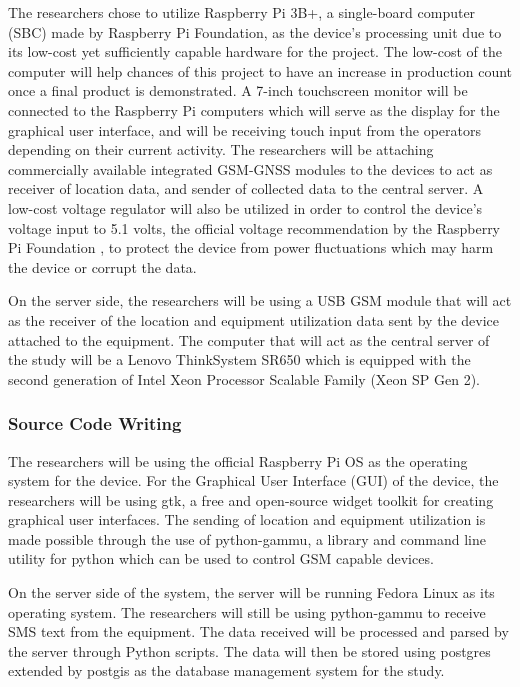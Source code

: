 \documentclass[12pt]{report}
\begin{document}
The researchers chose to utilize Raspberry Pi 3B+, a single-board computer (SBC) made by Raspberry Pi Foundation, as the device's processing unit due to its low-cost yet sufficiently capable hardware for the project. 
The low-cost of the computer will help chances of this project to have an increase in production count once a final product is demonstrated.
A 7-inch  touchscreen monitor will be connected to the Raspberry Pi computers which will serve as the display for the graphical user interface, and will be receiving touch input from the operators depending on their current activity.
The researchers will be attaching commercially available integrated GSM-GNSS modules to the devices to act as receiver of location data, and sender of collected data to the central server.
A low-cost voltage regulator will also be utilized in order to control the device's voltage input to 5.1 volts, the official voltage recommendation by the Raspberry Pi Foundation \cite{rpi}, to protect the device from power fluctuations which may harm the device or corrupt the data. 

On the server side, the researchers will be using a USB GSM module that will act as the receiver of the location and equipment utilization data sent by the device attached to the equipment. 
The computer that will act as the central server of the study will be a Lenovo ThinkSystem SR650 which is equipped with the second generation of Intel Xeon Processor Scalable Family (Xeon SP Gen 2).

\subsubsection{Source Code Writing}

The researchers will be using the official Raspberry Pi OS as the operating system for the device.
For the Graphical User Interface (GUI) of the device, the researchers will be using \Gls{gtk}, a free and open-source widget toolkit for creating graphical user interfaces.
The sending of location and equipment utilization is made possible through the use of \Gls{python}-\Gls{gammu}, a library and command line utility for python which can be used to control GSM capable devices. 

On the server side of the system, the server will be running Fedora Linux as its operating system.
The researchers will still be using python-gammu to receive SMS text from the equipment.
The data received will be processed and parsed by the server through Python scripts.
The data will then be stored using \Gls{postgres} extended by \Gls{postgis} as the database management system for the study.
\end{document}
